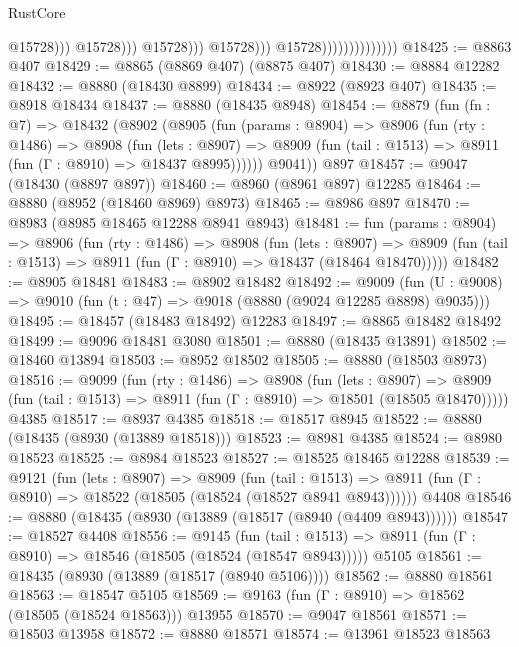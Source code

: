 \begin{lexlean}{RustCore}
\begin{coremodule}
                                                        @15728)))
                                                  @15728)))
                                            @15728)))
                                      @15728)))
                                @15728))))))))))))))
@18425 := @8863 @407
@18429 := @8865 (@8869 @407) (@8875 @407)
@18430 := @8884 @12282
@18432 := @8880 (@18430 @8899)
@18434 := @8922 (@8923 @407)
@18435 := @8918 @18434
@18437 := @8880 (@18435 @8948)
@18454 := @8879
    (fun (fn : @7) =>
    @18432
      (@8902
        (@8905
          (fun (params : @8904) =>
          @8906
            (fun (rty : @1486) =>
            @8908
              (fun (lets : @8907) =>
              @8909 (fun (tail : @1513) => @8911 (fun (Γ : @8910) => @18437 @8995))))))
        @9041))
    @897
@18457 := @9047 (@18430 (@8897 @897))
@18460 := @8960 (@8961 @897) @12285
@18464 := @8880 (@8952 (@18460 @8969) @8973)
@18465 := @8986 @897
@18470 := @8983 (@8985 @18465 @12288 @8941 @8943)
@18481 := fun (params : @8904) =>
  @8906
    (fun (rty : @1486) =>
    @8908
      (fun (lets : @8907) =>
      @8909 (fun (tail : @1513) => @8911 (fun (Γ : @8910) => @18437 (@18464 @18470)))))
@18482 := @8905 @18481
@18483 := @8902 @18482
@18492 := @9009
    (fun (U : @9008) => @9010 (fun (t : @47) => @9018 (@8880 (@9024 @12285 @8898) @9035)))
@18495 := @18457 (@18483 @18492) @12283
@18497 := @8865 @18482 @18492
@18499 := @9096 @18481 @3080
@18501 := @8880 (@18435 @13891)
@18502 := @18460 @13894
@18503 := @8952 @18502
@18505 := @8880 (@18503 @8973)
@18516 := @9099
    (fun (rty : @1486) =>
    @8908
      (fun (lets : @8907) =>
      @8909 (fun (tail : @1513) => @8911 (fun (Γ : @8910) => @18501 (@18505 @18470)))))
    @4385
@18517 := @8937 @4385
@18518 := @18517 @8945
@18522 := @8880 (@18435 (@8930 (@13889 @18518)))
@18523 := @8981 @4385
@18524 := @8980 @18523
@18525 := @8984 @18523
@18527 := @18525 @18465 @12288
@18539 := @9121
    (fun (lets : @8907) =>
    @8909
      (fun (tail : @1513) =>
      @8911 (fun (Γ : @8910) => @18522 (@18505 (@18524 (@18527 @8941 @8943))))))
    @4408
@18546 := @8880 (@18435 (@8930 (@13889 (@18517 (@8940 (@4409 @8943))))))
@18547 := @18527 @4408
@18556 := @9145
    (fun (tail : @1513) => @8911 (fun (Γ : @8910) => @18546 (@18505 (@18524 (@18547 @8943)))))
    @5105
@18561 := @18435 (@8930 (@13889 (@18517 (@8940 @5106))))
@18562 := @8880 @18561
@18563 := @18547 @5105
@18569 := @9163 (fun (Γ : @8910) => @18562 (@18505 (@18524 @18563))) @13955
@18570 := @9047 @18561
@18571 := @18503 @13958
@18572 := @8880 @18571
@18574 := @13961 @18523 @18563

\end{coremodule}
\end{lexlean}
